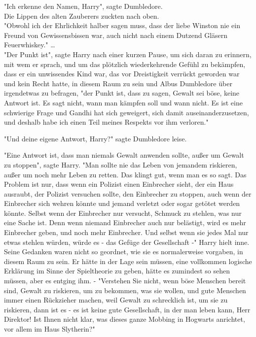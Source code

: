 {"Ich erkenne den Namen, Harry", sagte Dumbledore.\\ Die Lippen des alten Zauberers zuckten nach oben.\\ "Obwohl ich der Ehrlichkeit halber sagen muss, dass der liebe Winston nie ein Freund von Gewissensbissen war, auch nicht nach einem Dutzend Gläsern Feuerwhiskey." …\\ "Der Punkt ist", sagte Harry nach einer kurzen Pause, um sich daran zu erinnern, mit wem er sprach, und um das plötzlich wiederkehrende Gefühl zu bekämpfen, dass er ein unwissendes Kind war, das vor Dreistigkeit verrückt geworden war und kein Recht hatte, in diesem Raum zu sein und Albus Dumbledore über irgendetwas zu befragen, "der Punkt ist, dass zu sagen, Gewalt sei böse, keine Antwort ist. Es sagt nicht, wann man kämpfen soll und wann nicht. Es ist eine schwierige Frage und Gandhi hat sich geweigert, sich damit auseinanderzusetzen, und deshalb habe ich einen Teil meines Respekts vor ihm verloren."

"Und deine eigene Antwort, Harry?" sagte Dumbledore leise.

"Eine Antwort ist, dass man niemals Gewalt anwenden sollte, außer um Gewalt zu stoppen", sagte Harry. "Man sollte nie das Leben von jemandem riskieren, außer um noch mehr Leben zu retten. Das klingt gut, wenn man es so sagt. Das Problem ist nur, dass wenn ein Polizist einen Einbrecher sieht, der ein Haus ausraubt, der Polizist versuchen sollte, den Einbrecher zu stoppen, auch wenn der Einbrecher sich wehren könnte und jemand verletzt oder sogar getötet werden könnte. Selbst wenn der Einbrecher nur versucht, Schmuck zu stehlen, was nur eine Sache ist. Denn wenn niemand Einbrecher auch nur belästigt, wird es mehr Einbrecher geben, und noch mehr Einbrecher. Und selbst wenn sie jedes Mal nur etwas stehlen würden, würde es - das Gefüge der Gesellschaft -" Harry hielt inne.\\ Seine Gedanken waren nicht so geordnet, wie sie es normalerweise vorgaben, in diesem Raum zu sein. Er hätte in der Lage sein müssen, eine vollkommen logische Erklärung im Sinne der Spieltheorie zu geben, hätte es zumindest so sehen müssen, aber es entging ihm. - "Verstehen Sie nicht, wenn böse Menschen bereit sind, Gewalt zu riskieren, um zu bekommen, was sie wollen, und gute Menschen immer einen Rückzieher machen, weil Gewalt zu schrecklich ist, um sie zu riskieren, dann ist es - es ist keine gute Gesellschaft, in der man leben kann, Herr Direktor! Ist Ihnen nicht klar, was dieses ganze Mobbing in Hogwarts anrichtet, vor allem im Haus Slytherin?"

}
